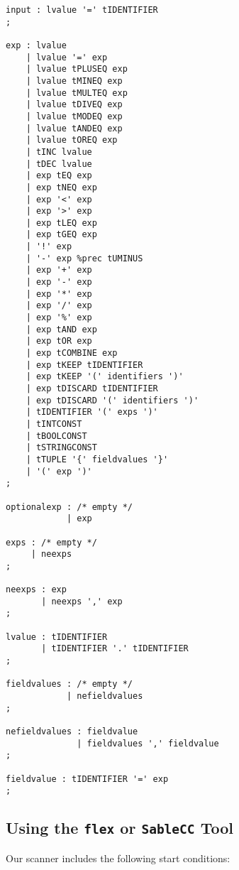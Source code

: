\documentclass{WigReport}
\begin{document}
\begin{verbatim}
input : lvalue '=' tIDENTIFIER
;

exp : lvalue
    | lvalue '=' exp
    | lvalue tPLUSEQ exp
    | lvalue tMINEQ exp
    | lvalue tMULTEQ exp
    | lvalue tDIVEQ exp
    | lvalue tMODEQ exp
    | lvalue tANDEQ exp
    | lvalue tOREQ exp
    | tINC lvalue
    | tDEC lvalue
    | exp tEQ exp
    | exp tNEQ exp
    | exp '<' exp
    | exp '>' exp
    | exp tLEQ exp
    | exp tGEQ exp
    | '!' exp
    | '-' exp %prec tUMINUS
    | exp '+' exp
    | exp '-' exp
    | exp '*' exp
    | exp '/' exp
    | exp '%' exp
    | exp tAND exp
    | exp tOR exp
    | exp tCOMBINE exp
    | exp tKEEP tIDENTIFIER
    | exp tKEEP '(' identifiers ')' 
    | exp tDISCARD tIDENTIFIER        
    | exp tDISCARD '(' identifiers ')'
    | tIDENTIFIER '(' exps ')'
    | tINTCONST
    | tBOOLCONST
    | tSTRINGCONST
    | tTUPLE '{' fieldvalues '}'
    | '(' exp ')'                 
;

optionalexp : /* empty */
            | exp

exps : /* empty */ 
     | neexps
;

neexps : exp 
       | neexps ',' exp
;

lvalue : tIDENTIFIER 
       | tIDENTIFIER '.' tIDENTIFIER
;

fieldvalues : /* empty */ 
            | nefieldvalues
;

nefieldvalues : fieldvalue 
              | fieldvalues ',' fieldvalue
;

fieldvalue : tIDENTIFIER '=' exp
;

\end{verbatim}
\makebox[\textwidth]{\hrulefill}

\subsection{Using the {\tt flex} or {\tt SableCC} Tool}

Our scanner includes the following start conditions:
\end{document}
